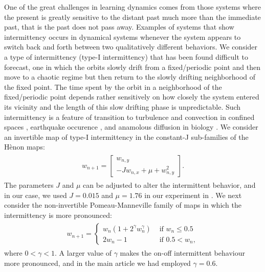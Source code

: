 \documentclass[12 pt]{article}
\begin{document}
One of the great challenges in learning dynamics comes from those systems where the present is greatly sensitive to the distant past much more than the immediate past, that is the past does not pass away.   Examples of systems that show intermittency occurs in dynamical systems whenever the system appears to switch back and forth between two qualitatively different behaviors. 
We consider a type of intermittency (type-I intermittency) that has been found difficult to forecast, one in which the orbits slowly drift from a fixed/periodic point and then move to a chaotic regime but then return to the slowly drifting neighborhood of the fixed point. The time spent by the orbit in a neighborhood of the fixed/periodic point  depends rather sensitively on how closely the system entered its vicinity and the length of this slow drifting phase is unpredictable. Such intermittency is a feature of transition to turbulence and convection in confined spaces \cite{pomeau1980intermittent}, earthquake occurence \cite{bottiglieri2007off},  and anamolous diffusion in biology \cite{klages2013weak}. We consider an invertible map of type-I intermittency in the constant-J sub-families of the H\`enon maps: \cite{kaplan1992return}
\begin{align}
    \begin{split}
        \label{Seq_Hen}
        w_{n+1}  = \begin{bmatrix} w_{n,y} \\
                -Jw_{n,x}+\mu+w_{n,y}^2\end{bmatrix}.
    \end{split}
\end{align}
The parameters $J$ and $\mu$ can be adjusted to alter the  intermittent behavior, and in our case, we used $J=0.015$ and $\mu=1.76$ in our experiment in \cite[Fig.~\ref{Fig_2}A,B,C]{Main_article}.
We next consider the non-invertible Pomeau-Manneville family of maps \cite{pomeau1980intermittent} in which the intermittency is more pronounced:
\begin{align}
    \begin{split}
        \label{Seq_PM}
w_{n+1}= \begin{cases} 
            w_n(1+2^{\gamma}w_n^{\gamma}) & \text{ if } w_n\leq 0.5\\
            2w_n-1 & \text{ if } 0.5 < w_n,
        \end{cases}
    \end{split}
\end{align}
where $0<\gamma<1$. A larger value of $\gamma$ makes the on-off intermittent behaviour more pronounced, and in the main article we had employed $\gamma=0.6$.
\end{document}
